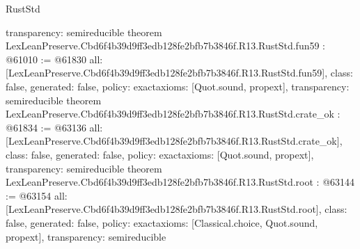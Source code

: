\begin{lexlean}{RustStd}
\begin{coremodule}
{  transparency: semireducible
}
theorem LexLeanPreserve.Cbd6f4b39d9ff3edb128fe2bfb7b3846f.R13.RustStd.fun59 : @61010 := @61830 {
  all: [LexLeanPreserve.Cbd6f4b39d9ff3edb128fe2bfb7b3846f.R13.RustStd.fun59],
  class: false,
  generated: false,
  policy: exact{axioms: [Quot.sound, propext]},
  transparency: semireducible
}
theorem LexLeanPreserve.Cbd6f4b39d9ff3edb128fe2bfb7b3846f.R13.RustStd.crate_ok : @61834 := @63136 {
  all: [LexLeanPreserve.Cbd6f4b39d9ff3edb128fe2bfb7b3846f.R13.RustStd.crate_ok],
  class: false,
  generated: false,
  policy: exact{axioms: [Quot.sound, propext]},
  transparency: semireducible
}
theorem LexLeanPreserve.Cbd6f4b39d9ff3edb128fe2bfb7b3846f.R13.RustStd.root : @63144 := @63154 {
  all: [LexLeanPreserve.Cbd6f4b39d9ff3edb128fe2bfb7b3846f.R13.RustStd.root],
  class: false,
  generated: false,
  policy: exact{axioms: [Classical.choice, Quot.sound, propext]},
  transparency: semireducible
}


\end{coremodule}
\end{lexlean}
